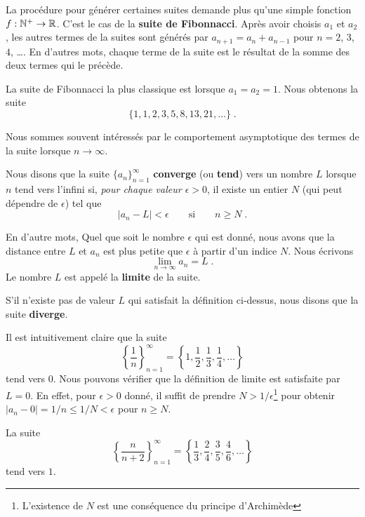 {\begin{egg}
La procédure pour générer certaines suites demande plus qu'une simple
fonction $f:\mathbb{N}^+ \rightarrow \mathbb{R}$.  C'est le cas de la
{\bfseries suite de Fibonnacci}.  Après avoir choisis $a_1$ et $a_2$, les
autres termes de la suites sont générés par $a_{n+1} = a_n + a_{n-1}$
pour $n=2$, $3$, $4$, \ldots.  En d'autres mots, chaque terme de la
suite est le résultat de la somme des deux termes qui le précède.

La suite de Fibonnacci la plus classique est lorsque $a_1=a_2=1$.  Nous
obtenons la suite
\[
\{ 1, 1, 2, 3, 5, 8, 13, 21, \ldots \}\; .
\]
\end{egg}

Nous sommes souvent intéressés par le comportement asymptotique des
termes de la suite lorsque $n\rightarrow \infty$.

\begin{defn}[+\theory] 
Nous disons que la suite $\{ a_n\}_{n=1}^\infty$ {\bfseries converge}
(ou {\bfseries tend}) vers un nombre $L$
lorsque $n$ tend vers l'infini si,
{\em pour chaque valeur $\epsilon >0$}, il existe un 
entier $N$ (qui peut dépendre de $\epsilon$) tel que
\[
|a_n-L| < \epsilon \qquad \text{si} \qquad n \geq N \; .
\]

En d'autre mots, Quel que soit le nombre $\epsilon$ qui est donné, nous
avons que la distance entre $L$ et $a_n$ est plus petite que $\epsilon$ à
partir d'un indice $N$.  Nous écrivons
\[
\lim_{n\rightarrow \infty} a_n = L \; .
\]
Le nombre $L$ est appelé la {\bfseries limite} de la
suite.

S'il n'existe pas de valeur $L$ qui satisfait la définition ci-dessus,
nous disons que la suite {\bfseries diverge}.
\end{defn}

\begin{egg}[\theory]
Il est intuitivement claire que la suite
\[
\left\{ \frac{1}{n} \right\}_{n=1}^\infty
= \left\{ 1 , \frac{1}{2}, \frac{1}{3}, \frac{1}{4}, \ldots \right\}
\]
tend vers $0$.  Nous pouvons vérifier que la définition de limite est
satisfaite par $L=0$.  En effet, pour $\epsilon >0$ donné, il suffit
de prendre $N > 1/\epsilon$\footnote{L'existence de $N$ est une
conséquence du principe d'Archimède} pour obtenir
$|a_n - 0| = 1/n \leq 1/N < \epsilon$ pour $n \geq N$.
\end{egg}

\begin{egg}[\theory]
La suite
\[
\left\{\frac{n}{n+2}\right\}_{n=1}^\infty
= \left\{ \frac{1}{3}, \frac{2}{4}, \frac{3}{5}, \frac{4}{6}, \ldots
\right\}
\]
tend vers $1$.


\end{egg}}

